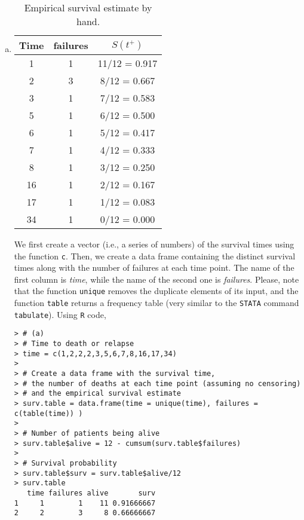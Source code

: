 \begin{enumerate}[(a)]
\item \begin{table}[ht]
\caption{Empirical survival estimate by hand.}
\centering
\begin{tabular}{c c c}
\hline
\hline
   Time & failures & $S(t^{+})$  \\ \hline
     1  &      1 & 11/12 = 0.917 \\
     2  &      3 & 8/12 = 0.667 \\
     3  &      1 & 7/12 = 0.583 \\ 
     5  &      1 & 6/12 = 0.500 \\
     6  &      1 & 5/12 = 0.417 \\
     7  &      1 & 4/12 = 0.333 \\ 
     8  &      1 & 3/12 = 0.250 \\ 
    16  &      1 & 2/12 = 0.167 \\ 
    17  &      1 & 1/12 = 0.083 \\ 
    34  &      1 & 0/12 = 0.000 \\
\hline
\end{tabular}
\label{table:1}
\end{table}
We first create a vector (i.e., a series of numbers) of the survival times using the function \verb|c|. Then, we create a data frame containing the distinct survival times along with the number of failures at each time point. The name of the first column is \emph{time}, while the name of the second one is \emph{failures}. Please, note that the function \verb|unique| removes the duplicate elements of its input, and the function \verb|table| returns a frequency table (very similar to the \verb|STATA| command \verb|tabulate|).
Using \verb|R| code,
\begin{footnotesize}
\begin{verbatim}
> # (a)
> # Time to death or relapse
> time = c(1,2,2,2,3,5,6,7,8,16,17,34)
> 
> # Create a data frame with the survival time, 
> # the number of deaths at each time point (assuming no censoring)
> # and the empirical survival estimate
> surv.table = data.frame(time = unique(time), failures = c(table(time)) )
> 
> # Number of patients being alive
> surv.table$alive = 12 - cumsum(surv.table$failures)
> 
> # Survival probability
> surv.table$surv = surv.table$alive/12
> surv.table
   time failures alive       surv
1     1        1    11 0.91666667
2     2        3     8 0.66666667

\end{verbatim}
\end{footnotesize}
\end{enumerate}
